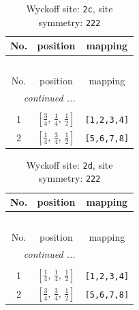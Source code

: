 \documentclass[fleqn,8pt]{jsarticle}
\begin{document}
\renewcommand{\arraystretch}{1.2}
\begin{longtable}{ccc}
\caption{Wyckoff site: {\tt 2c}, site symmetry: {\tt 222}}
 \\
 \hline \hline
No. & position & mapping \\ \hline \endfirsthead

\multicolumn{2}{l}{\tablename\ \thetable{}} \\
 \hline \hline
No. & position & mapping \\ \hline \endhead

 \hline \hline
\multicolumn{2}{r}{\footnotesize\it continued ...} \\ \endfoot

 \hline \hline
\multicolumn{2}{r}{} \\ \endlastfoot

1 & $\left[ \frac{3}{4},\, \frac{1}{4},\, \frac{1}{2} \right]$ & {\tt [1,2,3,4]} \\ \hline
2 & $\left[ \frac{1}{4},\, \frac{3}{4},\, \frac{1}{2} \right]$ & {\tt [5,6,7,8]} \\
\end{longtable}
\renewcommand{\arraystretch}{1.2}
\begin{longtable}{ccc}
\caption{Wyckoff site: {\tt 2d}, site symmetry: {\tt 222}}
 \\
 \hline \hline
No. & position & mapping \\ \hline \endfirsthead

\multicolumn{2}{l}{\tablename\ \thetable{}} \\
 \hline \hline
No. & position & mapping \\ \hline \endhead

 \hline \hline
\multicolumn{2}{r}{\footnotesize\it continued ...} \\ \endfoot

 \hline \hline
\multicolumn{2}{r}{} \\ \endlastfoot

1 & $\left[ \frac{1}{4},\, \frac{1}{4},\, \frac{1}{2} \right]$ & {\tt [1,2,3,4]} \\ \hline
2 & $\left[ \frac{3}{4},\, \frac{3}{4},\, \frac{1}{2} \right]$ & {\tt [5,6,7,8]} \\
\end{longtable}
\renewcommand{\arraystretch}{1.2}
\end{document}
